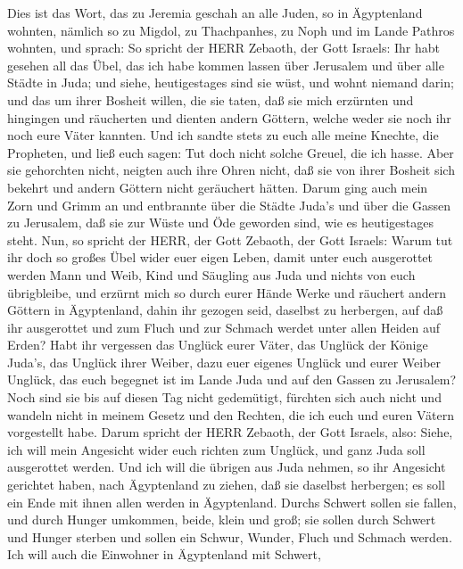  Dies ist das Wort, das zu Jeremia geschah an alle Juden, so
in Ägyptenland wohnten, nämlich so zu Migdol, zu Thachpanhes, zu Noph
und im Lande Pathros wohnten, und sprach:  So spricht der
HERR Zebaoth, der Gott Israels: Ihr habt gesehen all das Übel, das ich
habe kommen lassen über Jerusalem und über alle Städte in Juda; und
siehe, heutigestages sind sie wüst, und wohnt niemand darin;
 und das um ihrer Bosheit willen, die sie taten, daß sie
mich erzürnten und hingingen und räucherten und dienten andern Göttern,
welche weder sie noch ihr noch eure Väter kannten.  Und ich
sandte stets zu euch alle meine Knechte, die Propheten, und ließ euch
sagen: Tut doch nicht solche Greuel, die ich hasse.  Aber
sie gehorchten nicht, neigten auch ihre Ohren nicht, daß sie von ihrer
Bosheit sich bekehrt und andern Göttern nicht geräuchert hätten.
 Darum ging auch mein Zorn und Grimm an und entbrannte über
die Städte Juda's und über die Gassen zu Jerusalem, daß sie zur Wüste
und Öde geworden sind, wie es heutigestages steht.  Nun, so
spricht der HERR, der Gott Zebaoth, der Gott Israels: Warum tut ihr doch
so großes Übel wider euer eigen Leben, damit unter euch ausgerottet
werden Mann und Weib, Kind und Säugling aus Juda und nichts von euch
übrigbleibe,  und erzürnt mich so durch eurer Hände Werke
und räuchert andern Göttern in Ägyptenland, dahin ihr gezogen seid,
daselbst zu herbergen, auf daß ihr ausgerottet und zum Fluch und zur
Schmach werdet unter allen Heiden auf Erden?  Habt ihr
vergessen das Unglück eurer Väter, das Unglück der Könige Juda's, das
Unglück ihrer Weiber, dazu euer eigenes Unglück und eurer Weiber
Unglück, das euch begegnet ist im Lande Juda und auf den Gassen zu
Jerusalem?  Noch sind sie bis auf diesen Tag nicht
gedemütigt, fürchten sich auch nicht und wandeln nicht in meinem Gesetz
und den Rechten, die ich euch und euren Vätern vorgestellt habe.
 Darum spricht der HERR Zebaoth, der Gott Israels, also:
Siehe, ich will mein Angesicht wider euch richten zum Unglück, und ganz
Juda soll ausgerottet werden.  Und ich will die übrigen aus
Juda nehmen, so ihr Angesicht gerichtet haben, nach Ägyptenland zu
ziehen, daß sie daselbst herbergen; es soll ein Ende mit ihnen allen
werden in Ägyptenland. Durchs Schwert sollen sie fallen, und durch
Hunger umkommen, beide, klein und groß; sie sollen durch Schwert und
Hunger sterben und sollen ein Schwur, Wunder, Fluch und Schmach werden.
 Ich will auch die Einwohner in Ägyptenland mit Schwert,
